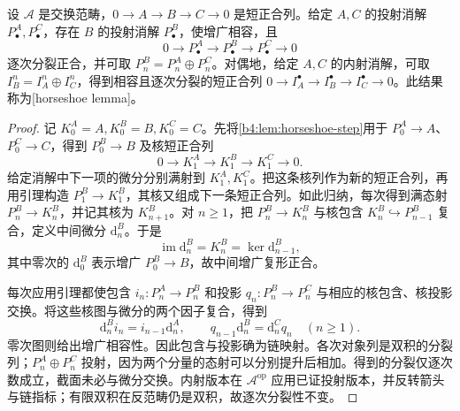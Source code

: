 \begin{theorem}[马蹄引理]\label{b4:thm:horseshoe}
	设 \(\mathcal A\) 是交换范畴，\(0\to A\to B\to C\to0\) 是短正合列。给定 \(A,C\) 的投射消解 \(P^A_\bullet,P^C_\bullet\)，存在 \(B\) 的投射消解 \(P^B_\bullet\)，使增广相容，且
	\[
		0\longrightarrow P^A_\bullet\longrightarrow P^B_\bullet \longrightarrow P^C_\bullet\longrightarrow0
	\]
	逐次分裂正合，并可取 \(P_n^B=P_n^A\oplus P_n^C\)。对偶地，给定 \(A,C\) 的内射消解，可取 \(I_B^n=I_A^n\oplus I_C^n\)，得到相容且逐次分裂的短正合列 \(0\to I_A^\bullet\to I_B^\bullet\to I_C^\bullet\to0\)。此结果称为[horseshoe lemma]。
\end{theorem}
\begin{proof}
	记 \(K_0^A=A,K_0^B=B,K_0^C=C\)。先将\cref{b4:lem:horseshoe-step}用于 \(P_0^A\to A\)、\(P_0^C\to C\)，得到 \(P_0^B\to B\) 及核短正合列
	\[
		0\longrightarrow K_1^A\longrightarrow K_1^B \longrightarrow K_1^C\longrightarrow0.
	\]
	给定消解中下一项的微分分别满射到 \(K_1^A,K_1^C\)。把这条核列作为新的短正合列，再用引理构造 \(P_1^B\to K_1^B\)，其核又组成下一条短正合列。如此归纳，每次得到满态射 \(P_n^B\to K_n^B\)，并记其核为 \(K_{n+1}^B\)。对 \(n\ge1\)，把 \(P_n^B\to K_n^B\) 与核包含 \(K_n^B\hookrightarrow P_{n-1}^B\) 复合，定义中间微分 \(\mathrm{d}_n^B\)。于是
	\[
		\operatorname{im}\mathrm{d}_n^B=K_n^B =\ker\mathrm{d}_{n-1}^B,
	\]
	其中零次的 \(\mathrm{d}_0^B\) 表示增广 \(P_0^B\to B\)，故中间增广复形正合。

	每次应用引理都使包含 \(i_n:P_n^A\to P_n^B\) 和投影 \(q_n:P_n^B\to P_n^C\) 与相应的核包含、核投影交换。将这些核图与微分的两个因子复合，得到
	\[
		\mathrm{d}_n^Bi_n=i_{n-1}\mathrm{d}_n^A, \qquad q_{n-1}\mathrm{d}_n^B=\mathrm{d}_n^Cq_n \quad(n\ge1).
	\]
	零次图则给出增广相容性。因此包含与投影确为链映射。各次对象列是双积的分裂列；\(P_n^A\oplus P_n^C\) 投射，因为两个分量的态射可以分别提升后相加。得到的分裂仅逐次数成立，截面未必与微分交换。内射版本在 \(\mathcal A^{\mathrm{op}}\) 应用已证投射版本，并反转箭头与链指标；有限双积在反范畴仍是双积，故逐次分裂性不变。
\end{proof}

